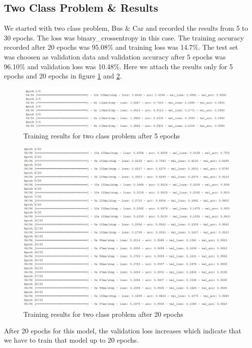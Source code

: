\subsection{Two Class Problem \& Results}
We started with two class problem, Bus \& Car and recorded the results from 5 to 30 epochs.
The loss was binary\_crossentropy in this case. 
The training accuracy recorded after 20 epochs was 95.08\% and training
loss was 14.7\%. The test set was choosen as validation data and validation accuracy after 5 epochs 
was 96.10\% and validation loss was 10.48\%.
Here we attach the results only for 5 epochs and 20 epochs
in figure \ref{fig:4.2} and \ref{fig:4.3}.
\begin{figure}[H]
    \centering
    \captionsetup{justification = centering}
    \includegraphics[scale = 0.63]{CHAPTERS/Chapter-4/Images/4.2}
    \caption{Training results for two class problem after 5 epochs} 
    \label{fig:4.2}
\end{figure}
\begin{figure}[H]
    \centering
    \captionsetup{justification = centering}
    \includegraphics[scale = 0.63]{CHAPTERS/Chapter-4/Images/4.3}
    \caption{Training results for two class problem after 20 epochs} 
    \label{fig:4.3}
\end{figure}
After 20 epochs for this model, the validation loss increases which indicate
that we have to train that model up to 20 epochs. 

